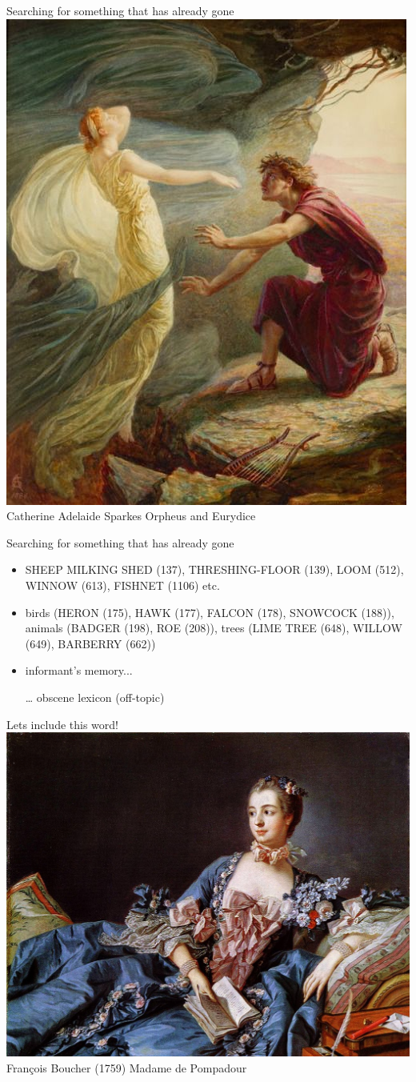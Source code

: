 \documentclass[13pt, t]{beamer}
\begin{document}
\begin{frame}{Searching for something that has already gone}
\includegraphics[width = 0.6\linewidth]{images/03_orpheus}\\
\small Catherine Adelaide Sparkes  Orpheus and Eurydice
\end{frame}

\begin{frame}{Searching for something that has already gone}
\begin{itemize}
\item SHEEP MILKING SHED (137), THRESHING-FLOOR (139), LOOM (512), WINNOW (613), FISHNET (1106) etc.
\item birds (HERON (175), HAWK (177), FALCON (178), SNOWCOCK (188)), animals (BADGER (198), ROE (208)), trees (LIME TREE (648), WILLOW (649), BARBERRY (662))
\item informant's memory...
\item[\dots] obscene lexicon (off-topic)
\end{itemize}
\end{frame}

\begin{frame}{Lets include this word!}
\includegraphics[width = 0.9\linewidth]{images/04_pompadour}\\
\small François Boucher (1759) Madame de Pompadour
\end{frame}
\end{document}
